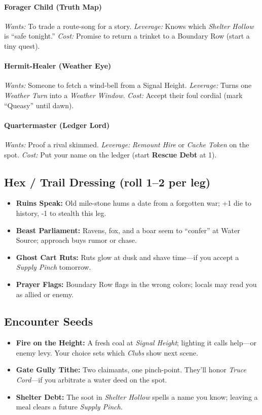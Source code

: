 \paragraph{Forager Child (Truth Map)}
\emph{Wants:} To trade a route-song for a story.  
\emph{Leverage:} Knows which \emph{Shelter Hollow} is “safe tonight.”  
\emph{Cost:} Promise to return a trinket to a Boundary Row (start a tiny quest).

\paragraph{Hermit-Healer (Weather Eye)}
\emph{Wants:} Someone to fetch a wind-bell from a Signal Height.  
\emph{Leverage:} Turns one \emph{Weather Turn} into a \emph{Weather Window}.  
\emph{Cost:} Accept their foul cordial (mark “Queasy” until dawn).

\paragraph{Quartermaster (Ledger Lord)}
\emph{Wants:} Proof a rival skimmed.  
\emph{Leverage:} \emph{Remount Hire} or \emph{Cache Token} on the spot.  
\emph{Cost:} Put your name on the ledger (start \textbf{Rescue Debt} at 1).
\subsection*{Hex / Trail Dressing (roll 1–2 per leg)}

\begin{itemize}
\item \textbf{Ruins Speak:} Old mile-stone hums a date from a forgotten war; +1 die to history, -1 to stealth this leg.
\item \textbf{Beast Parliament:} Ravens, fox, and a boar seem to “confer” at Water Source; approach buys rumor or chase.
\item \textbf{Ghost Cart Ruts:} Ruts glow at dusk and shave time—if you accept a \emph{Supply Pinch} tomorrow.
\item \textbf{Prayer Flags:} Boundary Row flags in the wrong colors; locals may read you as allied or enemy.
\end{itemize}
\subsection*{Encounter Seeds}

\begin{itemize}
\item \textbf{Fire on the Height:} A fresh coal at \emph{Signal Height}; lighting it calls help—or enemy levy. Your choice sets which \emph{Clubs} show next scene.
\item \textbf{Gate Gully Tithe:} Two claimants, one pinch-point. They’ll honor \emph{Truce Cord}—if you arbitrate a water deed on the spot.
\item \textbf{Shelter Debt:} The soot in \emph{Shelter Hollow} spells a name you know; leaving a meal clears a future \emph{Supply Pinch}.
\end{itemize}
